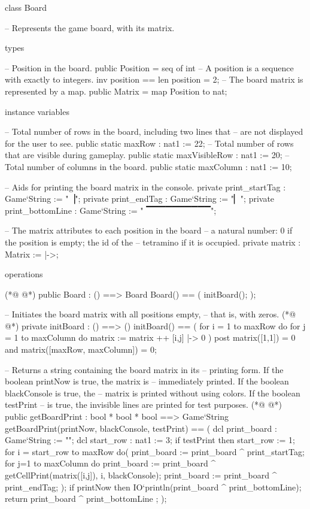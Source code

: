 \begin{vdmpp}[breaklines=true]
class Board

 -- Represents the game board, with its matrix.


 types
  
  -- Position in the board.
  public Position = seq of int
  -- A position is a sequence with exactly to integers.
  inv position == len position = 2;
  -- The board matrix is represented by a map.
  public Matrix = map Position to nat;


 instance variables
 
  -- Total number of rows in the board, including two lines that
  -- are not displayed for the user to see.
  public static maxRow  : nat1   := 22;
  -- Total number of rows that are visible during gameplay.
  public static maxVisibleRow : nat1   := 20;
  -- Total number of columns in the board.
  public static maxColumn  : nat1   := 10;

  -- Aids for printing the board matrix in the console.
  private print_startTag  : Game`String := "▕";
  private print_endTag  : Game`String := "▏\n";
  private print_bottomLine : Game`String := " ▔▔▔▔▔▔▔▔▔▔";
                                       
  -- The matrix attributes to each position in the board
  -- a natural number: 0 if the position is empty; the id of the
  -- tetramino if it is occupied.
  private matrix     : Matrix  := {|->};
     
                                                      
 operations
 
(*@
\label{Board:39}
@*)
  public Board : () ==> Board
  Board() == ( 
   initBoard();
  );
  
  -- Initiates the board matrix with all positions empty,
  -- that is, with zeros.
(*@
\label{initBoard:46}
@*)
  private initBoard : () ==> ()
  initBoard() == (  
   for i = 1 to maxRow do
    for j = 1 to maxColumn do
     matrix := matrix ++ {[i,j] |-> 0}
  )
  post matrix([1,1]) = 0 and matrix([maxRow, maxColumn]) = 0;

  -- Returns a string containing the board matrix in its
  -- printing form. If the boolean printNow is true, the matrix is
  -- immediately printed. If the boolean blackConsole is true, the
  -- matrix is printed without using colors. If the boolean testPrint
  -- is true, the invisible lines are printed for test purposes.
(*@
\label{getBoardPrint:59}
@*)
  public getBoardPrint : bool * bool * bool ==> Game`String
  getBoardPrint(printNow, blackConsole, testPrint) == ( 
   dcl print_board : Game`String := "\n";
   dcl start_row : nat1 := 3;
   if testPrint then start_row := 1;   
   for i = start_row to maxRow do(
    print_board := print_board ^ print_startTag;
      for j=1 to maxColumn do
       print_board := print_board 
        ^ getCellPrint(matrix([i,j]), i, blackConsole);
      print_board := print_board ^  print_endTag;
     );
     if printNow then
      IO`println(print_board ^ print_bottomLine);
    return print_board ^ print_bottomLine ;                   
  );
  

\end{vdmpp}
